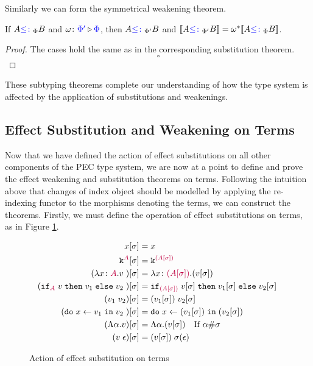 \documentclass{Report}
\begin{document}
Similarly we can form the symmetrical weakening theorem.

\begin{framed}
    \begin{theorem}\label{EffectWeakeningOnSubtyping}
        If $A {\color{blue} \leq\colon}_\Phi B$ and $\omega \colon {\color{blue}\Phi'} \triangleright {\color {blue} \Phi}$, then $A {\color{blue} \leq\colon}_{\Phi'} B$ and ${\bf [\![}A{\color{blue} \leq\colon}_{\Phi'} B{\bf ]\!]} = \omega^*{\bf [\![}A{\color{blue} \leq\colon}_\Phi B{\bf ]\!]}$.
    \end{theorem}
    
    
    \begin{proof}
        The cases hold the same as in the corresponding substitution theorem.
        $$\square$$
    \end{proof}
\end{framed}

These subtyping theorems complete our understanding of how the type system is affected by the application of substitutions and weakenings.

\subsection{Effect Substitution and Weakening on Terms}
Now that we have defined the action of effect substitutions on all other components of the PEC type system, we are now at a point to define and prove the effect weakening and substitution theorems on terms. Following the intuition above that changes of index object should be modelled by applying the re-indexing functor to the morphisms denoting the terms, we can construct the theorems. Firstly, we must define the operation of effect substitutions on terms, as in Figure \ref{EffectSubstitutionActionTerms}.

\begin{figure}[H]
    \centering
    \begin{framed}
        
\begin{align*}
    x[\sigma] & = x \\
    \texttt{k}^{\color{purple} A}[\sigma] & = \texttt{k}^{\color{purple} (A[\sigma])} \\
    (\lambda x \colon {\color{purple}A}. v\;)[\sigma] &= \lambda x \colon {\color{purple}(A[\sigma])}. (v[\sigma])\;\\
    (\texttt{if}_{\textcolor{purple}{A}}\; v\; \texttt{then}\; v_1 \;\texttt{else} \; v_2\;)[\sigma] &= \texttt{if}_{\textcolor{purple}{(A[\sigma])}}\; v[\sigma]\; \texttt{then}\; v_1[\sigma] \;\texttt{else} \; v_2[\sigma]\;\\
    (v_1\; v_2)[\sigma]&= (v_1[\sigma])\; v_2[\sigma]\\
    (\texttt{do}\; x \leftarrow v_1 \;\texttt{in}\; v_2\;)[\sigma]&= \texttt{do}\; x \leftarrow (v_1[\sigma]) \;\texttt{in}\; (v_2[\sigma])\;\\
    (\Lambda \alpha. v)[\sigma] & = \Lambda \alpha. (v[\sigma])\quad\text{If $\alpha\#\sigma$}\\
    (v\;\epsilon)[\sigma] & = (v[\sigma])\;\sigma(\epsilon)\\
\end{align*}
    \end{framed}
    
    \caption{Action of effect substitution on terms}
    \label{EffectSubstitutionActionTerms}
\end{figure}
\end{document}
